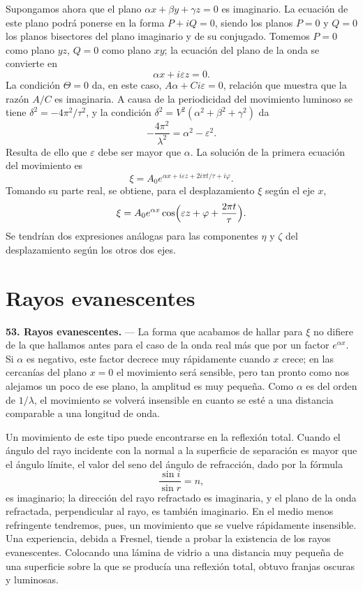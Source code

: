 Supongamos ahora que el plano $\alpha x+\beta y+\gamma z=0$ es imaginario.
La ecuación de este plano podrá ponerse en la forma $P+iQ=0$, siendo los
planos $P=0$ y $Q=0$ los planos bisectores del plano imaginario y de su
conjugado. Tomemos $P=0$ como plano $yz$, $Q=0$ como plano $xy$; la
ecuación del plano de la onda se convierte en
\[
\alpha x+i\varepsilon z=0.
\]
La condición $\Theta=0$ da, en este caso, $A\alpha+Ci\varepsilon=0$,
relación que muestra que la razón $A/C$ es imaginaria. A causa de la
periodicidad del movimiento luminoso se tiene
$\delta^2=-4\pi^2/\tau^2$, y la condición
$\delta^2=V^2(\alpha^2+\beta^2+\gamma^2)$ da
\[
-\frac{4\pi^2}{\lambda^2}=\alpha^2-\varepsilon^2.
\]
Resulta de ello que $\varepsilon$ debe ser mayor que $\alpha$. La
solución de la primera ecuación del movimiento es
\[
\xi=A_0e^{\alpha x+i\varepsilon z+2i\pi t/\tau+i\varphi}.
\]
Tomando su parte real, se obtiene, para el desplazamiento $\xi$ según el
eje $x$,
\[
\xi=A_0e^{\alpha x}\cos\Bigl(\varepsilon z+\varphi+\frac{2\pi t}{\tau}\Bigr).
\]
Se tendrían dos expresiones análogas para las componentes $\eta$ y
$\zeta$ del desplazamiento según los otros dos ejes.

\section{Rayos evanescentes}

\noindent\textbf{53. Rayos evanescentes.} — La forma que acabamos de
hallar para $\xi$ no difiere de la que hallamos antes para el caso de la
onda real más que por un factor $e^{\alpha x}$. Si $\alpha$ es negativo,
este factor decrece muy rápidamente cuando $x$ crece; en las cercanías
del plano $x=0$ el movimiento será sensible, pero tan pronto como nos
alejamos un poco de ese plano, la amplitud es muy pequeña. Como $\alpha$
es del orden de $1/\lambda$, el movimiento se volverá insensible en
cuanto se esté a una distancia comparable a una longitud de onda.

Un movimiento de este tipo puede encontrarse en la reflexión total.
Cuando el ángulo del rayo incidente con la normal a la superficie de
separación es mayor que el ángulo límite, el valor del seno del ángulo de
refracción, dado por la fórmula
\[
\frac{\sin i}{\sin r}=n,
\]
es imaginario; la dirección del rayo refractado es imaginaria, y el plano
de la onda refractada, perpendicular al rayo, es también imaginario. En
el medio menos refringente tendremos, pues, un movimiento que se vuelve
rápidamente insensible. Una experiencia, debida a Fresnel, tiende a
probar la existencia de los rayos evanescentes. Colocando una lámina de
vidrio a una distancia muy pequeña de una superficie sobre la que se
producía una reflexión total, obtuvo franjas oscuras y luminosas.

